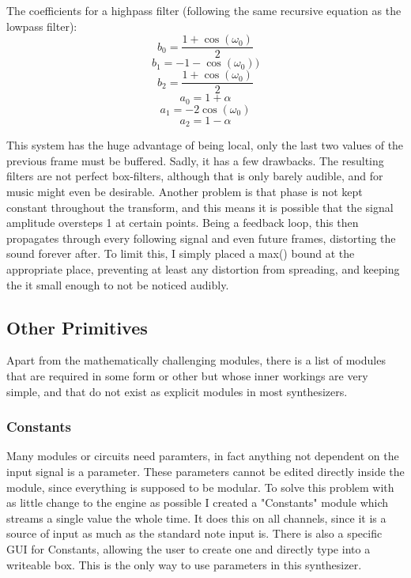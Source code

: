 \documentclass[11pt,a4paper]{article}
\begin{document}
The coefficients for a highpass filter (following the same recursive equation as the lowpass filter):
\begin{equation}
b_0 = \frac{1 + \cos(\omega_0)}{2}
\end{equation}
\begin{equation}
b_1 = -1 - \cos(\omega_0))
\end{equation}
\begin{equation}
b_2 = \frac{1 + \cos(\omega_0)}{2}
\end{equation}
\begin{equation}
a_0 = 1 + \alpha
\end{equation}
\begin{equation}
a_1 = -2\cos(\omega_0)
\end{equation}
\begin{equation}
a_2 = 1 - \alpha
\end{equation}

This system has the huge advantage of being local, only the last two values of the previous frame must be buffered.
Sadly, it has a few drawbacks. The resulting filters are not perfect box-filters, although that is only barely audible, and for music might even be desirable. Another problem is that phase is not kept constant throughout the transform, and this means it is possible that the signal amplitude oversteps 1 at certain points. Being a feedback loop, this then propagates through every following signal and even future frames, distorting the sound forever after.
To limit this, I simply placed a max() bound at the appropriate place, preventing at least any distortion from spreading, and keeping the it small enough to not be noticed audibly.

\subsection{Other Primitives}

Apart from the mathematically challenging modules, there is a list of modules that are required in some form or other but whose inner workings are very simple, and that do not exist as explicit modules in most synthesizers.

\subsubsection{Constants}

Many modules or circuits need paramters, in fact anything not dependent on the input signal is a parameter. These parameters cannot be edited directly inside the module, since everything is supposed to be modular. To solve this problem with as little change to the engine as possible I created a "Constants" module which streams a single value the whole time. It does this on all channels, since it is a source of input as much as the standard note input is. There is also a specific GUI for Constants, allowing the user to create one and directly type into a writeable box. This is the only way to use parameters in this synthesizer.
\end{document}

